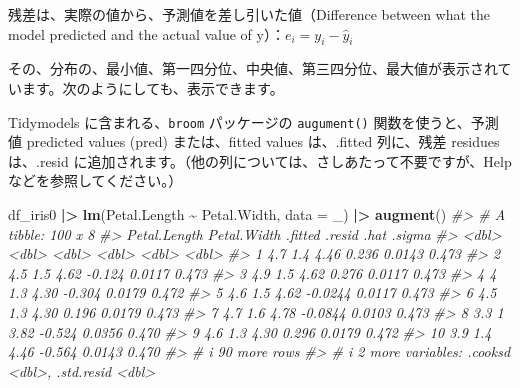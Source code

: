 \documentclass[
  xelatex, ja=standard]{bxjsbook}
\newenvironment{Shaded}{\begin{snugshade}}{\end{snugshade}}
\newcommand{\AttributeTok}[1]{\textcolor[rgb]{0.13,0.29,0.53}{#1}}
\newcommand{\CommentTok}[1]{\textcolor[rgb]{0.56,0.35,0.01}{\textit{#1}}}
\newcommand{\FunctionTok}[1]{\textcolor[rgb]{0.13,0.29,0.53}{\textbf{#1}}}
\newcommand{\NormalTok}[1]{#1}
\newcommand{\SpecialCharTok}[1]{\textcolor[rgb]{0.81,0.36,0.00}{\textbf{#1}}}
\theoremstyle{definition}
\theoremstyle{definition}
\theoremstyle{definition}
\theoremstyle{definition}
\theoremstyle{remark}
\begin{document}
残差は、実際の値から、予測値を差し引いた値（Difference between what the model predicted and the actual value of y）：\(e_i = y_i - \hat{y}_i\)

その、分布の、最小値、第一四分位、中央値、第三四分位、最大値が表示されています。次のようにしても、表示できます。

Tidymodels に含まれる、\texttt{broom} パッケージの \texttt{augument()} 関数を使うと、予測値 predicted values (pred) または、fitted values は、.fitted 列に、残差 residues は、.resid に追加されます。（他の列については、さしあたって不要ですが、Help などを参照してください。）

\begin{Shaded}
\begin{Highlighting}[]
\NormalTok{df\_iris0 }\SpecialCharTok{|\textgreater{}} \FunctionTok{lm}\NormalTok{(Petal.Length }\SpecialCharTok{\textasciitilde{}}\NormalTok{ Petal.Width, }\AttributeTok{data =}\NormalTok{ \_) }\SpecialCharTok{|\textgreater{}} \FunctionTok{augment}\NormalTok{()}
\CommentTok{\#\textgreater{} \# A tibble: 100 x 8}
\CommentTok{\#\textgreater{}    Petal.Length Petal.Width .fitted  .resid   .hat .sigma}
\CommentTok{\#\textgreater{}           \textless{}dbl\textgreater{}       \textless{}dbl\textgreater{}   \textless{}dbl\textgreater{}   \textless{}dbl\textgreater{}  \textless{}dbl\textgreater{}  \textless{}dbl\textgreater{}}
\CommentTok{\#\textgreater{}  1          4.7         1.4    4.46  0.236  0.0143  0.473}
\CommentTok{\#\textgreater{}  2          4.5         1.5    4.62 {-}0.124  0.0117  0.473}
\CommentTok{\#\textgreater{}  3          4.9         1.5    4.62  0.276  0.0117  0.473}
\CommentTok{\#\textgreater{}  4          4           1.3    4.30 {-}0.304  0.0179  0.472}
\CommentTok{\#\textgreater{}  5          4.6         1.5    4.62 {-}0.0244 0.0117  0.473}
\CommentTok{\#\textgreater{}  6          4.5         1.3    4.30  0.196  0.0179  0.473}
\CommentTok{\#\textgreater{}  7          4.7         1.6    4.78 {-}0.0844 0.0103  0.473}
\CommentTok{\#\textgreater{}  8          3.3         1      3.82 {-}0.524  0.0356  0.470}
\CommentTok{\#\textgreater{}  9          4.6         1.3    4.30  0.296  0.0179  0.472}
\CommentTok{\#\textgreater{} 10          3.9         1.4    4.46 {-}0.564  0.0143  0.470}
\CommentTok{\#\textgreater{} \# i 90 more rows}
\CommentTok{\#\textgreater{} \# i 2 more variables: .cooksd \textless{}dbl\textgreater{}, .std.resid \textless{}dbl\textgreater{}}
\end{Highlighting}
\end{Shaded}
\end{document}
